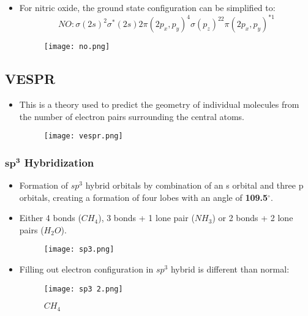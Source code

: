 \documentclass[12pt, letterpaper, twoside]{article}
\begin{document}
\begin{itemize}
    \item For nitric oxide, the ground state configuration can be simplified to:
    \begin{equation*}
        NO: \sigma(2s)^2\sigma^*(2s)2\pi(2p_x,p_y)^4\sigma(p_z)^22\pi(2p_x,p_y)^{*1}
    \end{equation*}
    \begin{figure}[!ht]
        \centering
        \texttt{[image: no.png]}
    \end{figure}
\end{itemize}
\subsection{VESPR}

\begin{itemize}
    \item This is a theory used to predict the geometry of individual molecules from the number of electron pairs surrounding the central atoms.
    \begin{figure}[!ht]
        \centering
        \texttt{[image: vespr.png]}
    \end{figure}
\end{itemize}

\subsubsection{$\mathbf{sp^3}$ Hybridization}

\begin{itemize}
    \item Formation of $sp^3$ hybrid orbitals by combination of an s orbital and three p orbitals, creating a formation of four lobes with an angle of \textbf{109.5}$^{\circ}$.
    \item Either 4 bonds ($CH_4$), 3 bonds + 1 lone pair ($NH_3$) or 2 bonds + 2 lone pairs ($H_2O$).
    \begin{figure}[!ht]
        \centering
        \texttt{[image: sp3.png]}
    \end{figure}
    \item Filling out electron configuration in $sp^3$ hybrid is different than normal:
    \begin{figure}[!ht]
        \centering
        \texttt{[image: sp3 2.png]}
        \caption{$CH_4$}
    \end{figure}
\end{itemize}
\end{document}
